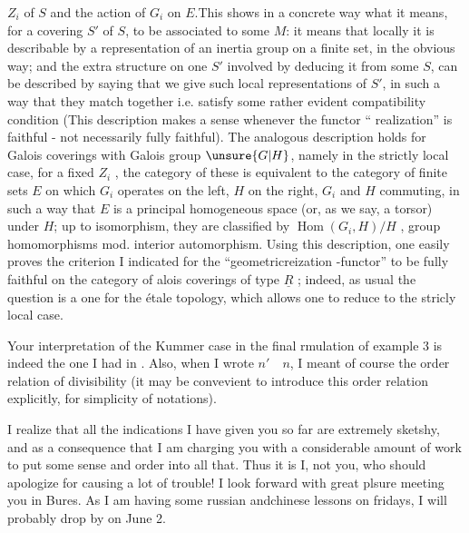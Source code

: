 $Z_i$ of $S$ and the action of $G_i$ on $E$.This shows in a  concrete way what it means,  for a covering $S'$ of $S$, to be associated to some $M$: it means that locally it is describable by a representation of an inertia group on a finite set, in the obvious way; and the extra structure on one $S'$ involved by deducing it from some $S$, can be described by saying that we give such local representations of $S'$, in such a way that they match together i.e. satisfy some rather evident compatibility condition (This description makes a sense whenever the functor `` realization'' is faithful - not necessarily fully faithful). The analogous description holds for Galois coverings with Galois group $\unsure{G|H}$, namely in the strictly local case, for a fixed $Z_i$ , the category of these is equivalent to the category of finite sets $E$ on which $G_i$ operates on the left, $H$ on the right, $G_i$ and $H$ commuting, in such a way that $E$ is a principal homogeneous space (or, as we say, a torsor) under $H$; up to isomorphism, they are classified by $\operatorname{Hom}(G_i,H)/H$ , group homomorphisms mod. interior automorphism. Using  this description, one easily proves the criterion I indicated for the ``geometricreization -functor'' to be fully faithful on the category of alois coverings of type $\underline{R}$ ; indeed, as usual the question is a  one for the étale topology, which allows one to  reduce to the stricly local case.

Your interpretation of the Kummer case in the final rmulation of example 3 is indeed the one I had in . Also, when I wrote $n'\quad n$, I meant of course the order relation of divisibility (it may be convevient to introduce this order relation explicitly, for simplicity of notations).


I realize that all the indications I have given you so far are extremely sketshy, and as a consequence that I am charging you with a considerable amount of work to put some sense and order into all that. Thus it is I, not you, who should apologize for causing a lot of trouble! I look forward with great plsure meeting you in Bures. As I am having some russian andchinese lessons on fridays, I will probably drop by on June 2.

